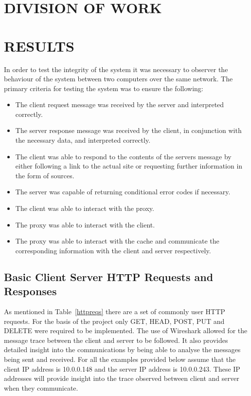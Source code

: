 \documentclass[10pt,twocolumn]{witseiepaper}
\begin{document}
\section{DIVISION OF WORK}

	

\section{RESULTS}

	In order to test the integrity of the system it was necessary to observer the behaviour of the system between two computers over the same network. The primary criteria for testing the system was to ensure the following:

	\begin{itemize}
		\item The client request message was received by the server and interpreted correctly.
		\item The server response message was received by the client, in conjunction with the necessary data, and interpreted correctly.
		\item The client was able to respond to the contents of the servers message by either following a link to the actual site or requesting further information in the form of sources.
		\item The server was capable of returning conditional error codes if necessary.
		\item The client was able to interact with the proxy.
		\item The proxy was able to interact with the client.
		\item The proxy was able to interact with the cache and communicate the corresponding information with the client and server respectively.
	\end{itemize}

	\subsection{Basic Client Server HTTP Requests and Responses} %
	\label{sub:basic_client_server}
		
		As mentioned in Table~\ref{httpreqs} there are a set of commonly user HTTP requests. For the basis of the project only GET, HEAD, POST, PUT and DELETE were required to be implemented. The use of Wireshark allowed for the message trace between the client and server to be followed. It also provides detailed insight into the communications by being able to analyse the messages being sent and received. For all the examples provided below assume that the client IP address is 10.0.0.148 and the server IP address is 10.0.0.243. These IP addresses will provide insight into the trace observed between client and server when they communicate.
		
\end{document}
